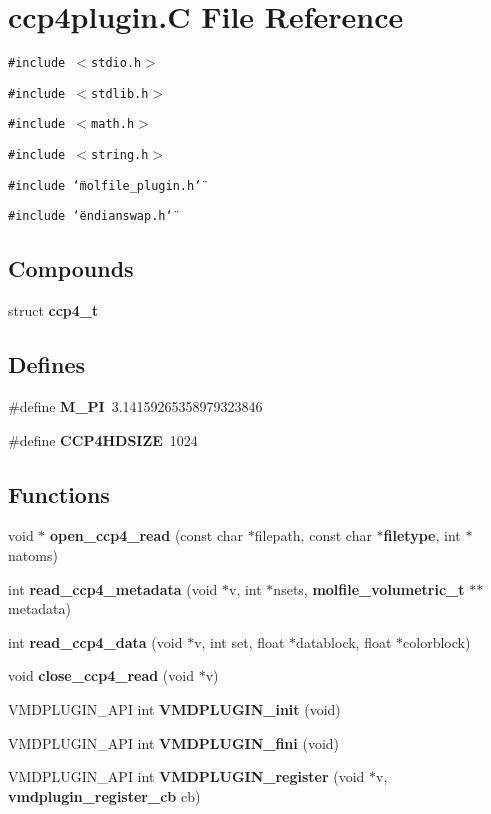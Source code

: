 \section{ccp4plugin.C File Reference}
\label{ccp4plugin_8C}
{\tt \#include $<$stdio.h$>$}\par
{\tt \#include $<$stdlib.h$>$}\par
{\tt \#include $<$math.h$>$}\par
{\tt \#include $<$string.h$>$}\par
{\tt \#include \char`\"{}molfile\_\-plugin.h\char`\"{}}\par
{\tt \#include \char`\"{}endianswap.h\char`\"{}}\par
\subsection*{Compounds}
\begin{CompactItemize}
\item 
struct {\bf ccp4\_\-t}
\end{CompactItemize}
\subsection*{Defines}
\begin{CompactItemize}
\item 
\#define {\bf M\_\-PI}\ 3.14159265358979323846
\item 
\#define {\bf CCP4HDSIZE}\ 1024
\end{CompactItemize}
\subsection*{Functions}
\begin{CompactItemize}
\item 
void $\ast$ {\bf open\_\-ccp4\_\-read} (const char $\ast$filepath, const char $\ast${\bf filetype}, int $\ast$natoms)
\item 
int {\bf read\_\-ccp4\_\-metadata} (void $\ast$v, int $\ast$nsets, {\bf molfile\_\-volumetric\_\-t} $\ast$$\ast$metadata)
\item 
int {\bf read\_\-ccp4\_\-data} (void $\ast$v, int set, float $\ast$datablock, float $\ast$colorblock)
\item 
void {\bf close\_\-ccp4\_\-read} (void $\ast$v)
\item 
VMDPLUGIN\_\-API int {\bf VMDPLUGIN\_\-init} (void)
\item 
VMDPLUGIN\_\-API int {\bf VMDPLUGIN\_\-fini} (void)
\item 
VMDPLUGIN\_\-API int {\bf VMDPLUGIN\_\-register} (void $\ast$v, {\bf vmdplugin\_\-register\_\-cb} cb)
\end{CompactItemize}
